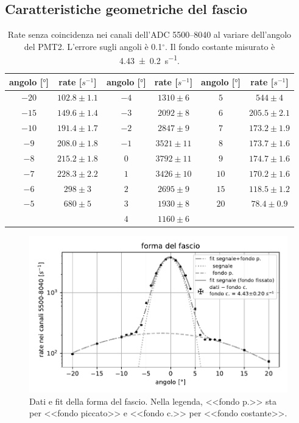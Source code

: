 \subsection{Caratteristiche geometriche del fascio}

\begin{table}
	\centering

	\begin{tabular}{cc|cc|cc}
		\toprule
		angolo [$\si{\degree}$] & rate [$\si{s^{-1}}$] & angolo [$\si{\degree}$] & rate [$\si{s^{-1}}$] & angolo [$\si{\degree}$] & rate [$\si{s^{-1}}$] \\
		\midrule
			$-20$ & $102.8 \pm 1.1$ & $-4$ & $1310 \pm 6$  & $5$ & $544 \pm 4$       \\
			$-15$ & $149.6 \pm 1.4$ & $-3$ & $2092 \pm 8$  & $6$ & $205.5 \pm 2.1$   \\
			$-10$ & $191.4 \pm 1.7$ & $-2$ & $2847 \pm 9$  & $7$ & $173.2 \pm 1.9$   \\
			$-9$ & $208.0 \pm 1.8$  & $-1$ & $3521 \pm 11$ & $8$ & $173.7 \pm 1.6$   \\
			$-8$ & $215.2 \pm 1.8$  & $0$ & $3792 \pm 11$  & $9$ & $174.7 \pm 1.6$   \\
			$-7$ & $228.3 \pm 2.2$  & $1$ & $3426 \pm 10$  & $10$ & $170.2 \pm 1.6$  \\
			$-6$ & $298 \pm 3$      & $2$ & $2695 \pm 9$   & $15$ & $118.5 \pm 1.2$  \\
			$-5$ & $680 \pm 5$      & $3$ & $1930 \pm 8$   & $20$ & $78.4 \pm 0.9$   \\
			     &                  & $4$ & $1160 \pm 6$   &      &\\
		 \bottomrule
	\end{tabular}

	\caption{Rate senza coincidenza nei canali dell'ADC 5500--8040
	al variare dell'angolo del PMT2.
	L'errore sugli angoli è 0.1$^{\circ}$.
	Il fondo costante misurato è \SI{4.43\pm0.2}{s^{-1}}.}
	\label{tabfo}
\end{table}

\begin{figure}
	\centering
	\includegraphics[width=32em]{forma}
	\caption{Dati e fit della forma del fascio.
	Nella legenda, <<fondo p.>> sta per <<fondo piccato>> e <<fondo c.>> per <<fondo costante>>.}
	\label{forma}
\end{figure}

